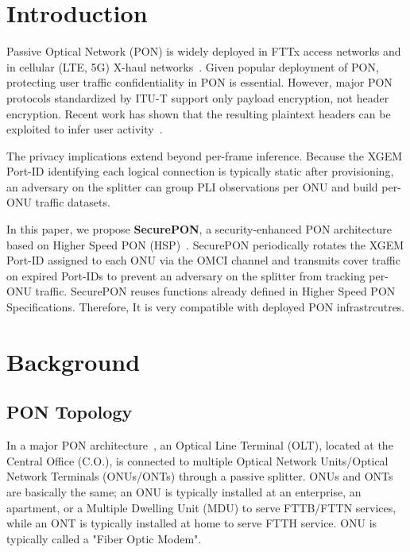 \documentclass[sigconf]{acmart}
\begin{document}
\maketitle

\section{Introduction}
Passive Optical Network (PON) is widely deployed in FTTx access networks and in cellular (LTE, 5G) X-haul networks~\cite{front}.
Given popular deployment of PON, protecting user traffic confidentiality in PON is essential. 
However, major PON protocols standardized by ITU-T support only payload encryption, not header encryption. Recent work has shown that the resulting plaintext headers can be exploited to infer user activity~\cite{PLI}.


The privacy implications extend beyond per-frame inference. Because the XGEM Port-ID identifying each logical connection is typically static after provisioning, an adversary on the splitter can group PLI observations per ONU and build per-ONU traffic datasets.


In this paper, we propose \textbf{SecurePON}, a security-enhanced PON architecture based on Higher Speed PON (HSP)~\cite{itu-50GPON}. SecurePON periodically rotates the XGEM Port-ID assigned to each ONU via the OMCI channel and transmits cover traffic on expired Port-IDs to prevent an adversary on the splitter from tracking per-ONU traffic. SecurePON reuses functions already defined
in Higher Speed PON Specifications. Therefore, It is very compatible with deployed PON infrastrcutres.

\section{Background}

\subsection{PON Topology}

In a major PON architecture~\cite{itu-g9843,itu-XGPON,itu-XGSPON,itu-NGPON2,itu-50GPON}, an Optical Line Terminal (OLT), located at the Central Office (C.O.), is connected to multiple Optical Network Units/Optical Network Terminals (ONUs/ONTs) through a passive splitter. ONUs and ONTs are basically the same; an ONU is typically installed at an enterprise, an apartment, or a Multiple Dwelling Unit (MDU) to serve FTTB/FTTN services, while an ONT is typically installed at home to serve FTTH service. ONU is typically called a "Fiber Optic Modem".
\end{document}
